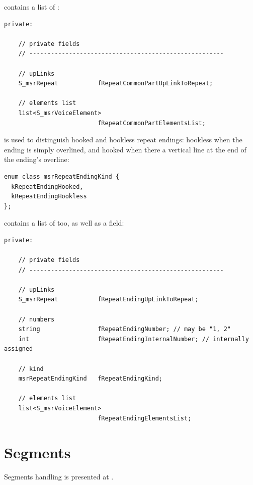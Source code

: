  contains a list of :
\begin{lstlisting}[language=CPlusPlus]
  private:

    // private fields
    // ------------------------------------------------------

    // upLinks
    S_msrRepeat           fRepeatCommonPartUpLinkToRepeat;

    // elements list
    list<S_msrVoiceElement>
                          fRepeatCommonPartElementsList;
\end{lstlisting}

 is used to distinguish hooked and hookless repeat endings: hookless when the ending is simply overlined, and hooked when there a vertical line at the end of the ending's overline:
\begin{lstlisting}[language=CPlusPlus]
enum class msrRepeatEndingKind {
  kRepeatEndingHooked,
  kRepeatEndingHookless
};
\end{lstlisting}

 contains a list of  too, as well as a  field:
\begin{lstlisting}[language=CPlusPlus]
  private:

    // private fields
    // ------------------------------------------------------

    // upLinks
    S_msrRepeat           fRepeatEndingUpLinkToRepeat;

    // numbers
    string                fRepeatEndingNumber; // may be "1, 2"
    int                   fRepeatEndingInternalNumber; // internally assigned

    // kind
    msrRepeatEndingKind   fRepeatEndingKind;

    // elements list
    list<S_msrVoiceElement>
                          fRepeatEndingElementsList;
\end{lstlisting}


\section{Segments}\label{Segments}

Segments handling is presented at .

